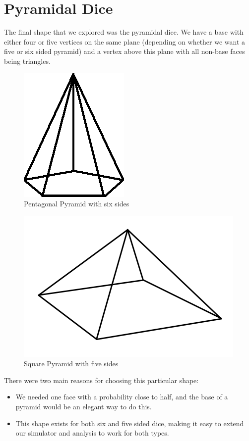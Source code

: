 \section{Pyramidal Dice}
The final shape that we explored was the pyramidal dice. We have a base with either four or five vertices on the same plane (depending on whether we want a five or six sided pyramid) and a vertex above this plane with all non-base faces being triangles.\\
\begin{figure}[h]
\center
\includegraphics[scale=1]{p-pyramid.png}
\caption{Pentagonal Pyramid with six sides}
\label{fig:pent_p}
\end{figure}

\begin{figure}[h]
\center
\includegraphics[scale=1]{pyramid_height.png}
\caption{Square Pyramid with five sides}
\label{fig:square_p}
\end{figure}

There were two main reasons for choosing this particular shape:\\
\begin{itemize}
    \item We needed one face with a probability close to half, and the base of a pyramid would be an elegant way to do this.\\
    \item This shape exists for both six and five sided dice, making it easy to extend our simulator and analysis to work for both types.\\
\end{itemize}

